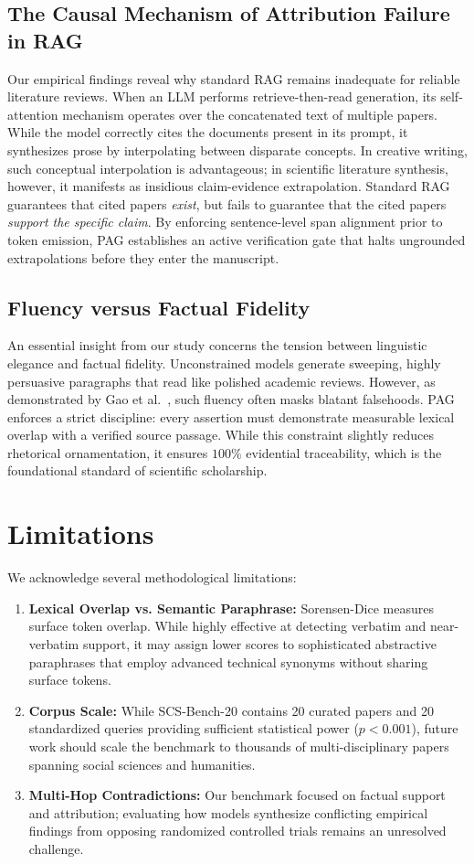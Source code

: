 \documentclass[acmsmall,screen]{acmart}
\begin{document}
\subsection{The Causal Mechanism of Attribution Failure in RAG}
Our empirical findings reveal why standard RAG remains inadequate for reliable literature reviews. When an LLM performs retrieve-then-read generation, its self-attention mechanism operates over the concatenated text of multiple papers. While the model correctly cites the documents present in its prompt, it synthesizes prose by interpolating between disparate concepts. In creative writing, such conceptual interpolation is advantageous; in scientific literature synthesis, however, it manifests as insidious claim-evidence extrapolation. Standard RAG guarantees that cited papers \emph{exist}, but fails to guarantee that the cited papers \emph{support the specific claim}. By enforcing sentence-level span alignment prior to token emission, PAG establishes an active verification gate that halts ungrounded extrapolations before they enter the manuscript.

\subsection{Fluency versus Factual Fidelity}
An essential insight from our study concerns the tension between linguistic elegance and factual fidelity. Unconstrained models generate sweeping, highly persuasive paragraphs that read like polished academic reviews. However, as demonstrated by Gao et al.~\cite{gao2023abstracts}, such fluency often masks blatant falsehoods. PAG enforces a strict discipline: every assertion must demonstrate measurable lexical overlap with a verified source passage. While this constraint slightly reduces rhetorical ornamentation, it ensures $100\%$ evidential traceability, which is the foundational standard of scientific scholarship.

\section{Limitations}

We acknowledge several methodological limitations:
\begin{enumerate}
    \item \textbf{Lexical Overlap vs. Semantic Paraphrase:} Sorensen-Dice measures surface token overlap. While highly effective at detecting verbatim and near-verbatim support, it may assign lower scores to sophisticated abstractive paraphrases that employ advanced technical synonyms without sharing surface tokens.
    \item \textbf{Corpus Scale:} While SCS-Bench-20 contains 20 curated papers and 20 standardized queries providing sufficient statistical power ($p < 0.001$), future work should scale the benchmark to thousands of multi-disciplinary papers spanning social sciences and humanities.
    \item \textbf{Multi-Hop Contradictions:} Our benchmark focused on factual support and attribution; evaluating how models synthesize conflicting empirical findings from opposing randomized controlled trials remains an unresolved challenge.
\end{enumerate}
\end{document}
